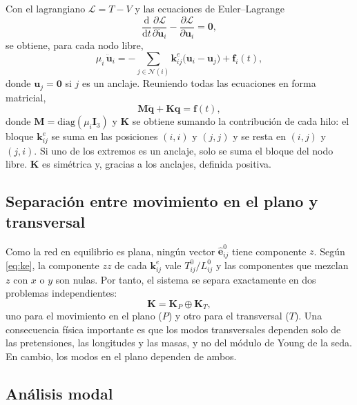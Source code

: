 \documentclass[11pt,letterpaper]{article}
\begin{document}
Con el lagrangiano $\mathcal{L}=T-V$ y las ecuaciones de Euler--Lagrange
\begin{equation}
    \frac{\mathrm{d}}{\mathrm{d}t}\frac{\partial\mathcal{L}}{\partial\dot{\mathbf{u}}_i}
    -\frac{\partial\mathcal{L}}{\partial\mathbf{u}_i}=\mathbf{0},
\end{equation}
se obtiene, para cada nodo libre,
\begin{equation}\label{eq:eom_local}
    \mu_i\,\ddot{\mathbf{u}}_i = -\sum_{j\in\mathcal{N}(i)}\mathbf{k}^e_{ij}\bigl(\mathbf{u}_i-\mathbf{u}_j\bigr)
    + \mathbf{f}_i(t),
\end{equation}
donde $\mathbf{u}_j=\mathbf{0}$ si $j$ es un anclaje. Reuniendo todas las
ecuaciones en forma matricial,
\begin{equation}\label{eq:sistema}
    \mathbf{M}\ddot{\mathbf{q}}+\mathbf{K}\mathbf{q}=\mathbf{f}(t),
\end{equation}
donde $\mathbf{M}=\mathrm{diag}(\mu_i\mathbf{I}_3)$ y $\mathbf{K}$ se obtiene
sumando la contribución de cada hilo: el bloque $\mathbf{k}^e_{ij}$ se suma
en las posiciones $(i,i)$ y $(j,j)$ y se resta en $(i,j)$ y $(j,i)$. Si uno de
los extremos es un anclaje, solo se suma el bloque del nodo libre.
$\mathbf{K}$ es simétrica y, gracias a los anclajes, definida positiva.

\subsection{Separación entre movimiento en el plano y transversal}

Como la red en equilibrio es plana, ningún vector $\hat{\mathbf{e}}^0_{ij}$
tiene componente $z$. Según \eqref{eq:ke}, la componente $zz$ de cada
$\mathbf{k}^e_{ij}$ vale $T^0_{ij}/L^0_{ij}$ y las componentes que mezclan
$z$ con $x$ o $y$ son nulas. Por tanto, el sistema se separa exactamente en
dos problemas independientes:
\begin{equation}\label{eq:desacople}
    \mathbf{K} = \mathbf{K}_P \oplus \mathbf{K}_T,
\end{equation}
uno para el movimiento en el plano ($P$) y otro para el transversal ($T$).
Una consecuencia física importante es que los modos transversales dependen
solo de las pretensiones, las longitudes y las masas, y no del módulo de
Young de la seda. En cambio, los modos en el plano dependen de ambos.

\subsection{Análisis modal}
\end{document}

